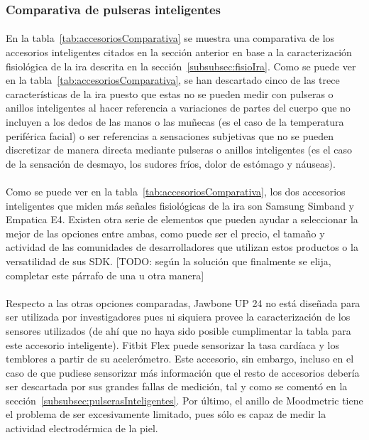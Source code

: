 \subsubsection{Comparativa de pulseras inteligentes}
\label{subsubsec:comparativaPulseras}
\paragraph{}
En la tabla~\ref{tab:accesoriosComparativa} se muestra una comparativa de los accesorios inteligentes citados en la sección anterior en base a la caracterización fisiológica de la ira descrita en la sección~\ref{subsubsec:fisioIra}. Como se puede ver en la tabla~\ref{tab:accesoriosComparativa}, se han descartado cinco de las trece características de la ira puesto que estas no se pueden medir con pulseras o anillos inteligentes al hacer referencia a variaciones de partes del cuerpo que no incluyen a los dedos de las manos o las muñecas (es el caso de la temperatura periférica facial) o ser referencias a sensaciones subjetivas que no se pueden discretizar de manera directa mediante pulseras o anillos inteligentes (es el caso de la sensación de desmayo, los sudores fríos, dolor de estómago y náuseas).

\paragraph{}
Como se puede ver en la tabla~\ref{tab:accesoriosComparativa}, los dos accesorios inteligentes que miden más señales fisiológicas de la ira son Samsung Simband y Empatica E4. Existen otra serie de elementos que pueden ayudar a seleccionar la mejor de las opciones entre ambas, como puede ser el precio, el tamaño y actividad de las comunidades de desarrolladores que utilizan estos productos o la versatilidad de sus \ac{SDK}. [TODO: según la solución que finalmente se elija, completar este párrafo de una u otra manera]

\paragraph{}
Respecto a las otras opciones comparadas, Jawbone UP 24 no está diseñada para ser utilizada por investigadores pues ni siquiera provee la caracterización de los sensores utilizados (de ahí que no haya sido posible cumplimentar la tabla para este accesorio inteligente). Fitbit Flex puede sensorizar la tasa cardíaca y los temblores a partir de su acelerómetro. Este accesorio, sin embargo, incluso en el caso de que pudiese sensorizar más información que el resto de accesorios debería ser descartada por sus grandes fallas de medición, tal y como se comentó en la sección~\ref{subsubsec:pulserasInteligentes}. Por último, el anillo de Moodmetric tiene el problema de ser excesivamente limitado, pues sólo es capaz de medir la actividad electrodérmica de la piel.

